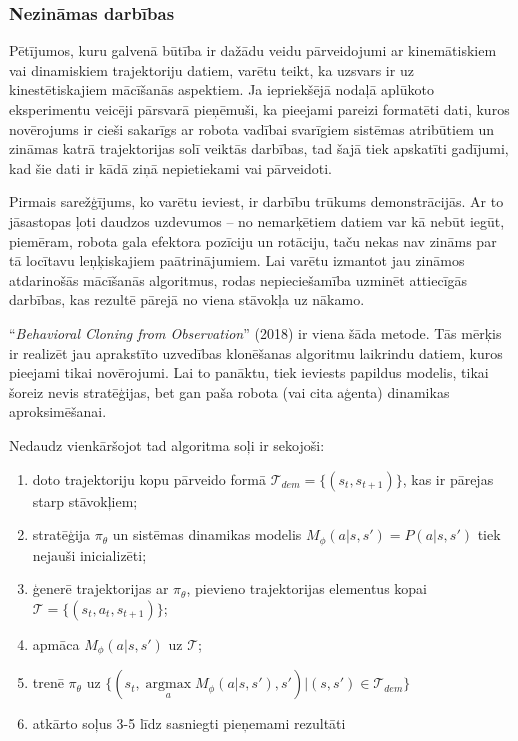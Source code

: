 \documentclass[12pt, a4paper]{article}
\numberwithin{equation}{section} %
\begin{document}
\subsubsection{Nezināmas darbības}

Pētījumos, kuru galvenā būtība ir dažādu veidu pārveidojumi ar kinemātiskiem vai dinamiskiem trajektoriju datiem, varētu teikt, ka uzsvars ir uz kinestētiskajiem mācīšanās aspektiem. Ja iepriekšējā nodaļā aplūkoto eksperimentu veicēji pārsvarā pieņēmuši, ka pieejami pareizi formatēti dati, kuros novērojums ir cieši sakarīgs ar robota vadībai svarīgiem sistēmas atribūtiem un zināmas katrā trajektorijas solī veiktās darbības, tad šajā tiek apskatīti gadījumi, kad šie dati ir kādā ziņā nepietiekami vai pārveidoti.

Pirmais sarežģījums, ko varētu ieviest, ir darbību trūkums demonstrācijās. Ar to jāsastopas ļoti daudzos uzdevumos -- no nemarķētiem datiem var kā nebūt iegūt, piemēram, robota gala efektora pozīciju un rotāciju, taču nekas nav zināms par tā locītavu leņķiskajiem paātrinājumiem. Lai varētu izmantot jau zināmos atdarinošās mācīšanās algoritmus, rodas nepieciešamība uzminēt attiecīgās darbības, kas rezultē pārejā no viena stāvokļa uz nākamo.

``\textit{Behavioral Cloning from Observation}'' \cite{torabi2018behavioral} (2018) ir viena šāda metode. Tās mērķis ir realizēt jau aprakstīto uzvedības klonēšanas algoritmu laikrindu datiem, kuros pieejami tikai novērojumi. Lai to panāktu, tiek ieviests papildus modelis, tikai šoreiz nevis stratēģijas, bet gan paša robota (vai cita aģenta) dinamikas aproksimēšanai.

Nedaudz vienkāršojot tad algoritma soļi ir sekojoši:

\begin{enumerate}
    \item doto trajektoriju kopu pārveido formā $\mathcal{T}_{dem}=\lbrace (s_t, s_{t+1}) \rbrace$, kas ir pārejas starp stāvokļiem;
    \item stratēģija $\pi_{\theta}$ un sistēmas dinamikas modelis $M_{\phi}(a \vert s,s')=P(a \vert s, s')$ tiek nejauši inicializēti;
    \item ģenerē trajektorijas ar $\pi_{\theta}$, pievieno trajektorijas elementus kopai $\mathcal{T}=\lbrace (s_t, a_t, s_{t+1}) \rbrace$;
    \item apmāca $M_{\phi}(a \vert s, s')$ uz $\mathcal{T}$;
    \item trenē $\pi_{\theta}$ uz $\lbrace (s_t, \operatorname*{argmax}\limits_a M_{\phi}(a \vert s, s'), s')\vert (s, s') \in \mathcal{T}_{dem} \rbrace$
    \item atkārto soļus 3-5 līdz sasniegti pieņemami rezultāti
\end{enumerate}
\end{document}
